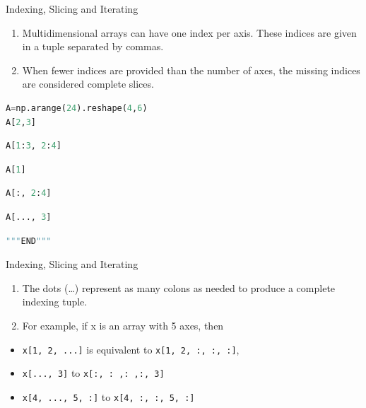 \documentclass[ignorenonframetext,11pt,xcolor=dvipsnames,hyperref={colorlinks,allcolors=.,urlcolor=blue, citecolor=violet, bookmarksdepth=4},aspectratio=1610]{beamer}
\providecommand{\tightlist}{%
  \setlength{\itemsep}{0pt}\setlength{\parskip}{0pt}}
\newcommand{\passthrough}[1]{#1}
\begin{document}
\begin{frame}[fragile]{Indexing, Slicing and Iterating}
\protect\hypertarget{indexing-slicing-and-iterating-2}{}

\begin{enumerate}
\tightlist
\item
  Multidimensional arrays can have one index per axis. These indices are
  given in a tuple separated by commas.
\item
  When fewer indices are provided than the number of axes, the missing
  indices are considered complete slices.
\end{enumerate}

\begin{lstlisting}[language=Python]
A=np.arange(24).reshape(4,6)
A[2,3]
\end{lstlisting}

\begin{lstlisting}[language=Python]
A[1:3, 2:4]
\end{lstlisting}

\begin{lstlisting}[language=Python]
A[1]
\end{lstlisting}

\begin{lstlisting}[language=Python]
A[:, 2:4]
\end{lstlisting}

\begin{lstlisting}[language=Python]
A[..., 3]
\end{lstlisting}

\begin{lstlisting}[language=Python]
"""END"""
\end{lstlisting}

\end{frame}

\begin{frame}[fragile]{Indexing, Slicing and Iterating}
\protect\hypertarget{indexing-slicing-and-iterating-3}{}

\begin{enumerate}
\tightlist
\item
  The dots (\ldots) represent as many colons as needed to produce a
  complete indexing tuple.
\item
  For example, if x is an array with 5 axes, then
\end{enumerate}

\begin{itemize}
\tightlist
\item
  \passthrough{\lstinline!x[1, 2, ...]!} is equivalent to
  \passthrough{\lstinline!x[1, 2, :, :, :]!},
\item
  \passthrough{\lstinline!x[..., 3]!} to
  \passthrough{\lstinline!x[:, : ,: ,:, 3]!}
\item
  \passthrough{\lstinline!x[4, ..., 5, :]!} to
  \passthrough{\lstinline!x[4, :, :, 5, :]!}
\end{itemize}

\end{frame}
\end{document}
